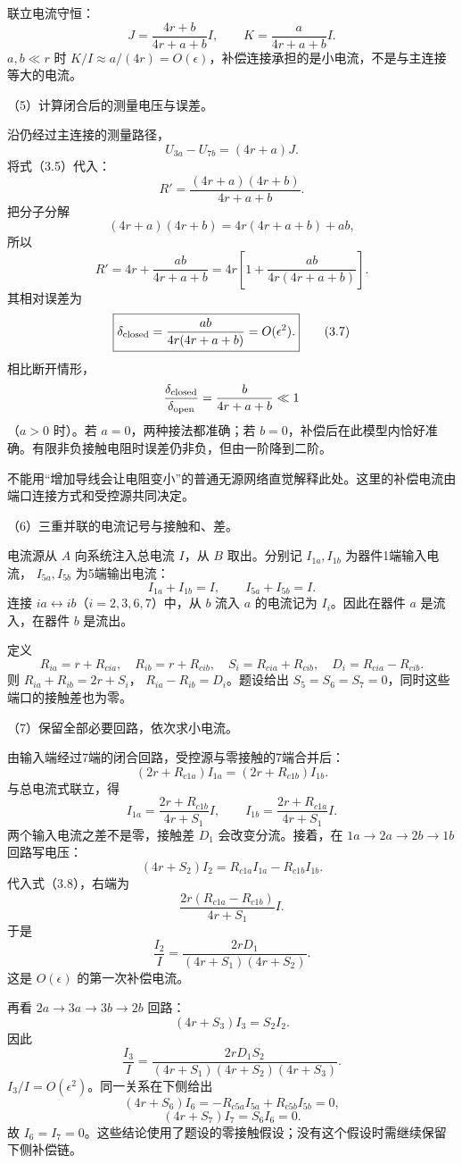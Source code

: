 \documentclass[12pt,a4paper,fontset=fandol]{ctexart}
\begin{document}
联立电流守恒： \[
\boxed{J=\frac{4r+b}{4r+a+b}I,\qquad
K=\frac{a}{4r+a+b}I.}\tag{3.5}
\] \(a,b\ll r\) 时
\(K/I\approx a/(4r)=O(\epsilon)\)，补偿连接承担的是小电流，不是与主连接等大的电流。

（5）计算闭合后的测量电压与误差。

沿仍经过主连接的测量路径， \[
U_{3a}-U_{7b}=(4r+a)J.
\] 将式（3.5）代入： \[
R'=\frac{(4r+a)(4r+b)}{4r+a+b}.
\] 把分子分解 \[
(4r+a)(4r+b)=4r(4r+a+b)+ab,
\] 所以 \[
\boxed{R'=4r+\frac{ab}{4r+a+b}
=4r\left[1+\frac{ab}{4r(4r+a+b)}\right].}\tag{3.6}
\] 其相对误差为 \[
\boxed{\delta_{\rm closed}
=\frac{ab}{4r(4r+a+b)}=O(\epsilon^2).}\tag{3.7}
\] 相比断开情形， \[
\frac{\delta_{\rm closed}}{\delta_{\rm open}}
=\frac{b}{4r+a+b}\ll1
\] （\(a>0\) 时）。若 \(a=0\)，两种接法都准确；若
\(b=0\)，补偿后在此模型内恰好准确。有限非负接触电阻时误差仍非负，但由一阶降到二阶。

不能用``增加导线会让电阻变小''的普通无源网络直觉解释此处。这里的补偿电流由端口连接方式和受控源共同决定。

（6）三重并联的电流记号与接触和、差。

电流源从 \(A\) 向系统注入总电流 \(I\)，从 \(B\) 取出。分别记
\(I_{1a},I_{1b}\) 为器件1端输入电流， \(I_{5a},I_{5b}\) 为5端输出电流：
\[
I_{1a}+I_{1b}=I,\qquad
I_{5a}+I_{5b}=I.
\] 连接 \(ia\leftrightarrow ib\)（\(i=2,3,6,7\)）中，从 \(b\) 流入 \(a\)
的电流记为 \(I_i\)。因此在器件 \(a\) 是流入，在器件 \(b\) 是流出。

定义 \[
R_{ia}=r+R_{cia},\quad R_{ib}=r+R_{cib},\quad
S_i=R_{cia}+R_{cib},\quad D_i=R_{cia}-R_{cib}.
\] 则 \(R_{ia}+R_{ib}=2r+S_i\)， \(R_{ia}-R_{ib}=D_i\)。题设给出
\(S_5=S_6=S_7=0\)，同时这些端口的接触差也为零。

（7）保留全部必要回路，依次求小电流。

由输入端经过7端的闭合回路，受控源与零接触的7端合并后： \[
(2r+R_{c1a})I_{1a}
=(2r+R_{c1b})I_{1b}.
\] 与总电流式联立，得 \[
\boxed{
I_{1a}=\frac{2r+R_{c1b}}{4r+S_1}I,\qquad
I_{1b}=\frac{2r+R_{c1a}}{4r+S_1}I.}\tag{3.8}
\] 两个输入电流之差不是零，接触差 \(D_1\) 会改变分流。接着，在
\(1a\to2a\to2b\to1b\) 回路写电压： \[
(4r+S_2)I_2=R_{c1a}I_{1a}-R_{c1b}I_{1b}.
\] 代入式（3.8），右端为 \[
\frac{2r(R_{c1a}-R_{c1b})}{4r+S_1}I.
\] 于是 \[
\boxed{\frac{I_2}{I}
=\frac{2rD_1}{(4r+S_1)(4r+S_2)}.}\tag{3.9}
\] 这是 \(O(\epsilon)\) 的第一次补偿电流。

再看 \(2a\to3a\to3b\to2b\) 回路： \[
(4r+S_3)I_3=S_2I_2.
\] 因此 \[
\boxed{\frac{I_3}{I}
=\frac{2rD_1S_2}
{(4r+S_1)(4r+S_2)(4r+S_3)}.}\tag{3.10}
\] \(I_3/I=O(\epsilon^2)\)。同一关系在下侧给出 \[
(4r+S_6)I_6=-R_{c5a}I_{5a}+R_{c5b}I_{5b}=0,
\] \[
(4r+S_7)I_7=S_6I_6=0.
\] 故
\(I_6=I_7=0\)。这些结论使用了题设的零接触假设；没有这个假设时需继续保留下侧补偿链。
\end{document}
